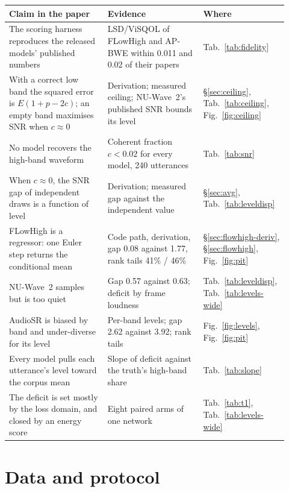 \documentclass[10pt,letterpaper]{article}
\begin{document}
\begin{table}[H]
\small\centering
\begin{tabular}{p{0.34\linewidth}p{0.33\linewidth}p{0.25\linewidth}}
\toprule
Claim in the paper & Evidence & Where \\
\midrule
The scoring harness reproduces the released models' published numbers & LSD/ViSQOL of FLowHigh and AP-BWE within 0.011 and 0.02 of their papers & Tab.~\ref{tab:fidelity} \\
With a correct low band the squared error is $E(1+p-2c)$; an empty band maximises SNR when $c\approx0$ & Derivation; measured ceiling; NU-Wave~2's published SNR bounds its level & \S\ref{sec:ceiling}, Tab.~\ref{tab:ceiling}, Fig.~\ref{fig:ceiling} \\
No model recovers the high-band waveform & Coherent fraction $c<0.02$ for every model, 240 utterances & Tab.~\ref{tab:snr} \\
When $c\approx0$, the SNR gap of independent draws is a function of level & Derivation; measured gap against the independent value & \S\ref{sec:avg}, Tab.~\ref{tab:leveldisp} \\
FLowHigh is a regressor: one Euler step returns the conditional mean & Code path, derivation, gap 0.08 against 1.77, rank tails 41\% / 46\% & \S\ref{sec:flowhigh-deriv}, \S\ref{sec:flowhigh}, Fig.~\ref{fig:pit} \\
NU-Wave~2 samples but is too quiet & Gap 0.57 against 0.63; deficit by frame loudness & Tab.~\ref{tab:leveldisp}, Tab.~\ref{tab:levels-wide} \\
AudioSR is biased by band and under-diverse for its level & Per-band levels; gap 2.62 against 3.92; rank tails & Fig.~\ref{fig:levels}, Fig.~\ref{fig:pit} \\
Every model pulls each utterance's level toward the corpus mean & Slope of deficit against the truth's high-band share & Tab.~\ref{tab:slope} \\
The deficit is set mostly by the loss domain, and closed by an energy score & Eight paired arms of one network & Tab.~\ref{tab:t1}, Tab.~\ref{tab:levels-wide} \\
\bottomrule
\end{tabular}
\end{table}

\section{Data and protocol}\label{sec:data}
\end{document}
